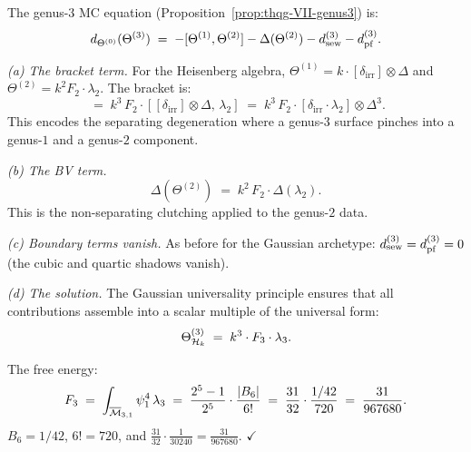 \begin{computation}
The genus-$3$ MC equation
(Proposition~\ref{prop:thqg-VII-genus3}) is:
\begin{equation}%
d_{\Theta^{(0)}}(\Theta^{(3)})
\;=\;
-[\Theta^{(1)},\Theta^{(2)}]
- \Delta(\Theta^{(2)})
- \dsew^{(3)}
- \dpf^{(3)}.
\end{equation}

\medskip\noindent\emph{(a) The bracket term.}
For the Heisenberg algebra, $\Theta^{(1)} = k \cdot
[\delta_{\mathrm{irr}}] \otimes \Delta$ and
$\Theta^{(2)} = k^2 F_2 \cdot \lambda_2$. The bracket is:
\begin{equation}%
[\Theta^{(1)},\Theta^{(2)}]
\;=\;
k^3 \, F_2 \cdot
[[\delta_{\mathrm{irr}}] \otimes \Delta,\, \lambda_2]
\;=\;
k^3 \, F_2 \cdot [\delta_{\mathrm{irr}} \cdot \lambda_2]
\otimes \Delta^3.
\end{equation}
This encodes the separating degeneration where a genus-$3$
surface pinches into a genus-$1$ and a genus-$2$ component.

\medskip\noindent\emph{(b) The BV term.}
\begin{equation}%
\Delta(\Theta^{(2)})
\;=\;
k^2 \, F_2 \cdot \Delta(\lambda_2).
\end{equation}
This is the non-separating clutching applied to the genus-$2$
data.

\medskip\noindent\emph{(c) Boundary terms vanish.}
As before for the Gaussian archetype:
$d_{\mathrm{sew}}^{(3)} = d_{\mathrm{pf}}^{(3)} = 0$ (the cubic and quartic
shadows vanish).

\medskip\noindent\emph{(d) The solution.}
The Gaussian universality principle ensures that all
contributions assemble into a scalar multiple of the universal
form:
\begin{equation}%
\Theta^{(3)}_{\cH_k}
\;=\;
k^3 \cdot F_3 \cdot \lambda_3.
\end{equation}

The free energy:
\begin{equation}%
F_3
\;=\;
\int_{\overline{\cM}_{3,1}} \psi_1^{4}\,\lambda_3
\;=\;
\frac{2^5 - 1}{2^5} \cdot \frac{|B_6|}{6!}
\;=\;
\frac{31}{32} \cdot \frac{1/42}{720}
\;=\;
\frac{31}{967680}.
\end{equation}
$B_6 = 1/42$, $6! = 720$, and
$\frac{31}{32} \cdot \frac{1}{30240} = \frac{31}{967680}$. $\checkmark$
\end{computation}

